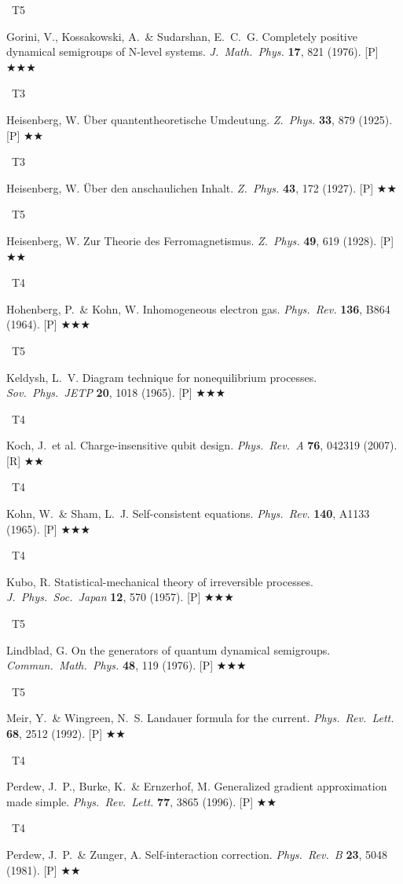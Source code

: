 \documentclass[11pt,a4paper]{article}
\newcommand{\tierbadge}[2]{\colorbox{#1}{\small\bfseries\color{white}\strut\ #2\ }}
\newcommand{\essential}{$\bigstar\bigstar\bigstar$}
\newcommand{\recommended}{$\bigstar\bigstar$}
\begin{document}
\begin{tcolorbox}[catbox]
\begin{enumerate}[leftmargin=2.5em,label=\textbf{[E\arabic*]},itemsep=3pt]
  \item \tierbadge{t5red}{T5} Gorini, V., Kossakowski, A.\ \& Sudarshan, E.~C.~G. Completely positive dynamical semigroups of N-level systems. \textit{J.~Math.~Phys.} \textbf{17}, 821 (1976). [P] \essential
  \item \tierbadge{t3purple}{T3} Heisenberg, W. \"Uber quantentheoretische Umdeutung. \textit{Z.~Phys.} \textbf{33}, 879 (1925). [P] \recommended
  \item \tierbadge{t3purple}{T3} Heisenberg, W. \"Uber den anschaulichen Inhalt. \textit{Z.~Phys.} \textbf{43}, 172 (1927). [P] \recommended
  \item \tierbadge{t5red}{T5} Heisenberg, W. Zur Theorie des Ferromagnetismus. \textit{Z.~Phys.} \textbf{49}, 619 (1928). [P] \recommended
  \item \tierbadge{t4orange}{T4} Hohenberg, P.\ \& Kohn, W. Inhomogeneous electron gas. \textit{Phys.~Rev.} \textbf{136}, B864 (1964). [P] \essential
  \item \tierbadge{t5red}{T5} Keldysh, L.~V. Diagram technique for nonequilibrium processes. \textit{Sov.~Phys.~JETP} \textbf{20}, 1018 (1965). [P] \essential
  \item \tierbadge{t4orange}{T4} Koch, J.\ et al. Charge-insensitive qubit design. \textit{Phys.~Rev.~A} \textbf{76}, 042319 (2007). [R] \recommended
  \item \tierbadge{t4orange}{T4} Kohn, W.\ \& Sham, L.~J. Self-consistent equations. \textit{Phys.~Rev.} \textbf{140}, A1133 (1965). [P] \essential
  \item \tierbadge{t4orange}{T4} Kubo, R. Statistical-mechanical theory of irreversible processes. \textit{J.~Phys.~Soc.~Japan} \textbf{12}, 570 (1957). [P] \essential
  \item \tierbadge{t5red}{T5} Lindblad, G. On the generators of quantum dynamical semigroups. \textit{Commun.~Math.~Phys.} \textbf{48}, 119 (1976). [P] \essential
  \item \tierbadge{t5red}{T5} Meir, Y.\ \& Wingreen, N.~S. Landauer formula for the current. \textit{Phys.~Rev.~Lett.} \textbf{68}, 2512 (1992). [P] \recommended
  \item \tierbadge{t4orange}{T4} Perdew, J.~P., Burke, K.\ \& Ernzerhof, M. Generalized gradient approximation made simple. \textit{Phys.~Rev.~Lett.} \textbf{77}, 3865 (1996). [P] \recommended
  \item \tierbadge{t4orange}{T4} Perdew, J.~P.\ \& Zunger, A. Self-interaction correction. \textit{Phys.~Rev.~B} \textbf{23}, 5048 (1981). [P] \recommended

\end{enumerate}
\end{tcolorbox}
\end{document}
